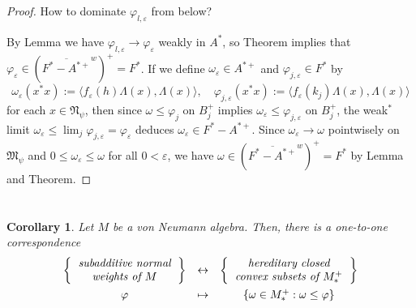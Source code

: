 \documentclass[a4paper]{amsart}
\newcommand{\e}{\varepsilon}
\theoremstyle{plain}
\newtheorem{cor}[thm]{Corollary}
\theoremstyle{definition}
\begin{document}
\begin{proof}
How to dominate $\varphi_{l,\e}$ from below?

By Lemma we have $\varphi_{l,\e}\to\varphi_\e$ weakly in $A^*$, so Theorem implies that $\varphi_\e\in(\overline{F^*-A^{*+}}^w)^+=F^*$.
If we define $\omega_\e\in A^{*+}$ and $\varphi_{j,\e}\in F^*$ by
\[\omega_\e(x^*x):=\langle f_\e(h)\Lambda(x),\Lambda(x)\rangle,\quad\varphi_{j,\e}(x^*x):=\langle f_\e(k_j)\Lambda(x),\Lambda(x)\rangle\]
for each $x\in\mathfrak{N}_\psi$, then since $\omega\le\varphi_j$ on $B_j^+$ implies $\omega_\e\le\varphi_{j,\e}$ on $B_j^+$, the weak$^*$ limit $\omega_\e\le\lim_j\varphi_{j,\e}=\varphi_\e$ deduces $\omega_\e\in F^*-A^{*+}$.
Since $\omega_\e\to\omega$ pointwisely on $\mathfrak{M}_\psi$ and $0\le\omega_\e\le\omega$ for all $0<\e$, we have $\omega\in(\overline{F^*-A^{*+}}^w)^+=F^*$ by Lemma and Theorem.
\end{proof}





\section{}

\begin{cor}
Let $M$ be a von Neumann algebra.
Then, there is a one-to-one correspondence
\[\begin{array}{ccc}
\left\{\emph{\begin{tabular}{c}subadditive normal\\weights of $M$\end{tabular}}\right\}&\leftrightarrow&\left\{\emph{\begin{tabular}{c}hereditary closed\\convex subsets of $M_*^+$\end{tabular}}\right\}\\[10pt]
\varphi&\mapsto&\{\omega\in M_*^+:\omega\le\varphi\}
\end{array}\]
\end{cor}
\end{document}
